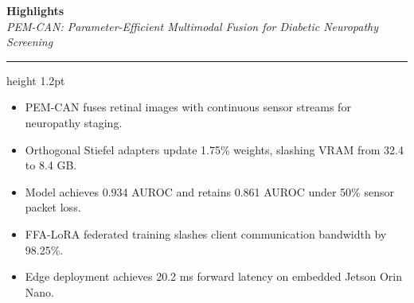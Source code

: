 \documentclass[11pt,a4paper]{article}
\begin{document}
\pagestyle{empty}

{\LARGE \textbf{\color{unrblue}Highlights}}\\[4pt]
{\large \textit{PEM-CAN: Parameter-Efficient Multimodal Fusion for Diabetic Neuropathy Screening}}\\[12pt]
{\color{unrblue}\hrule height 1.2pt}
\vspace{18pt}

\begin{itemize}\setlength{\itemsep}{12pt}
    \item PEM-CAN fuses retinal images with continuous sensor streams for neuropathy staging.
    \item Orthogonal Stiefel adapters update 1.75\% weights, slashing VRAM from 32.4 to 8.4 GB.
    \item Model achieves 0.934 AUROC and retains 0.861 AUROC under 50\% sensor packet loss.
    \item FFA-LoRA federated training slashes client communication bandwidth by 98.25\%.
    \item Edge deployment achieves 20.2 ms forward latency on embedded Jetson Orin Nano.
\end{itemize}
\end{document}
